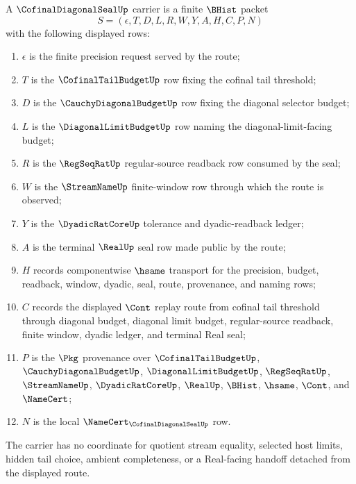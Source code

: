 \begin{definition}
\label{def:cofinal-diagonal-seal-carrier}
A $\CofinalDiagonalSealUp$ carrier is a finite $\BHist$ packet
$$
S=(\epsilon,T,D,L,R,W,Y,A,H,C,P,N)
$$
with the following displayed rows:
\begin{enumerate}
\item $\epsilon$ is the finite precision request served by the route;
\item $T$ is the $\CofinalTailBudgetUp$ row fixing the cofinal tail threshold;
\item $D$ is the $\CauchyDiagonalBudgetUp$ row fixing the diagonal selector budget;
\item $L$ is the $\DiagonalLimitBudgetUp$ row naming the diagonal-limit-facing budget;
\item $R$ is the $\RegSeqRatUp$ regular-source readback row consumed by the seal;
\item $W$ is the $\StreamNameUp$ finite-window row through which the route is observed;
\item $Y$ is the $\DyadicRatCoreUp$ tolerance and dyadic-readback ledger;
\item $A$ is the terminal $\RealUp$ seal row made public by the route;
\item $H$ records componentwise $\hsame$ transport for the precision, budget, readback, window, dyadic, seal, route, provenance, and naming rows;
\item $C$ records the displayed $\Cont$ replay route from cofinal tail threshold through diagonal budget, diagonal limit budget, regular-source readback, finite window, dyadic ledger, and terminal Real seal;
\item $P$ is the $\Pkg$ provenance over $\CofinalTailBudgetUp$, $\CauchyDiagonalBudgetUp$, $\DiagonalLimitBudgetUp$, $\RegSeqRatUp$, $\StreamNameUp$, $\DyadicRatCoreUp$, $\RealUp$, $\BHist$, $\hsame$, $\Cont$, and $\NameCert$;
\item $N$ is the local $\NameCert_{\CofinalDiagonalSealUp}$ row.
\end{enumerate}
The carrier has no coordinate for quotient stream equality, selected host limits, hidden tail choice, ambient completeness, or a Real-facing handoff detached from the displayed route.
\end{definition}

